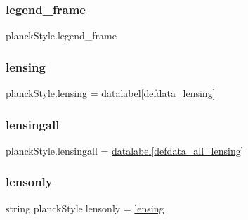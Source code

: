 \subsubsection{\texorpdfstring{legend\+\_\+frame}{legend\_frame}}
{\footnotesize\ttfamily planck\+Style.\+legend\+\_\+frame}

\mbox{\label{namespaceplanckStyle_a444ad7b6645bdd1c5221347a4aacb75b}} 
\subsubsection{\texorpdfstring{lensing}{lensing}}
{\footnotesize\ttfamily planck\+Style.\+lensing = \mbox{\hyperlink{namespaceplanckStyle_a8da1128119eb2cdd66bc98e4099d374c}{datalabel}}\mbox{[}\mbox{\hyperlink{namespaceplanckStyle_a313a4de00b6651d5ead8b86a584adb63}{defdata\+\_\+lensing}}\mbox{]}}

\mbox{\label{namespaceplanckStyle_a04eae29bb8bc3e3345df0f3c73c88200}} 
\subsubsection{\texorpdfstring{lensingall}{lensingall}}
{\footnotesize\ttfamily planck\+Style.\+lensingall = \mbox{\hyperlink{namespaceplanckStyle_a8da1128119eb2cdd66bc98e4099d374c}{datalabel}}\mbox{[}\mbox{\hyperlink{namespaceplanckStyle_ac95fea9e23ed11d50eb8d2f2da4b45d5}{defdata\+\_\+all\+\_\+lensing}}\mbox{]}}

\mbox{\label{namespaceplanckStyle_a6af9ab09d1e0b7e2f834b8d6c2b0a1a7}} 
\subsubsection{\texorpdfstring{lensonly}{lensonly}}
{\footnotesize\ttfamily string planck\+Style.\+lensonly = \textquotesingle{}\mbox{\hyperlink{namespaceplanckStyle_a444ad7b6645bdd1c5221347a4aacb75b}{lensing}}\textquotesingle{}}

\mbox{\label{namespaceplanckStyle_af927756912359e87c6e2efecc463f68c}} 
